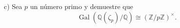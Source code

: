 c) Sea $p$ un número primo y demuestre que
\[\operatorname{Gal}(\mathbb{Q}(\zeta_{p})/\mathbb{Q})\cong (\mathbb{Z}/p\mathbb{Z})^{\times}.\]

